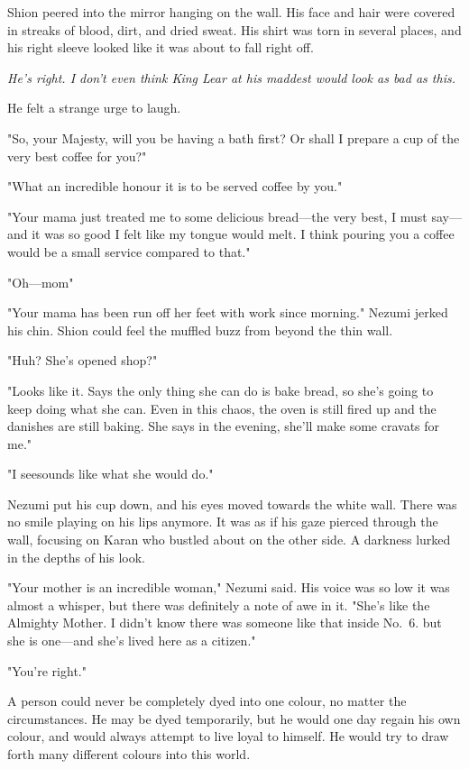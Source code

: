 Shion peered into the mirror hanging on the wall. His face and hair were
covered in streaks of blood, dirt, and dried sweat. His shirt was torn
in several places, and his right sleeve looked like it was about to fall
right off.

\emph{He's right. I don't even think King Lear at his maddest would look as
bad as this.}

He felt a strange urge to laugh.

"So, your Majesty, will you be having a bath first? Or shall I prepare a
cup of the very best coffee for you?"

"What an incredible honour it is to be served coffee by you."

"Your mama just treated me to some delicious bread---the very best, I must
say---and it was so good I felt like my tongue would melt. I think pouring
you a coffee would be a small service compared to that."

"Oh---mom\el "

"Your mama has been run off her feet with work since morning." Nezumi
jerked his chin. Shion could feel the muffled buzz from beyond the thin
wall.

"Huh? She's opened shop?"

"Looks like it. Says the only thing she can do is bake bread, so she's
going to keep doing what she can. Even in this chaos, the oven is still
fired up and the danishes are still baking. She says in the evening,
she'll make some cravats for me."

"I see\el sounds like what she would do."

Nezumi put his cup down, and his eyes moved towards the white wall.
There was no smile playing on his lips anymore. It was as if his gaze
pierced through the wall, focusing on Karan who bustled about on the
other side. A darkness lurked in the depths of his look.

"Your mother is an incredible woman," Nezumi said. His voice was so low
it was almost a whisper, but there was definitely a note of awe in it.
"She's like the Almighty Mother. I didn't know there was someone like
that inside No.~6. but she is one---and she's lived here as a citizen."

"\el You're right."

A person could never be completely dyed into one colour, no matter the
circumstances. He may be dyed temporarily, but he would one day regain
his own colour, and would always attempt to live loyal to himself. He
would try to draw forth many different colours into this world.


